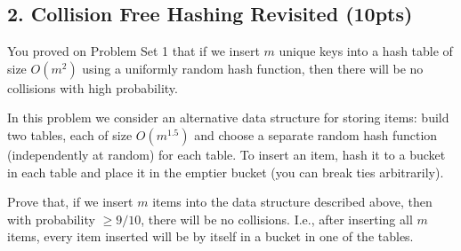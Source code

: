 \documentclass[10pt]{article}
\begin{document}
\begin{enumerate}[label=(\alph*)]
%	
	
\end{enumerate}

\newpage


\subsection{2. Collision Free Hashing Revisited (\textbf {\small 10pts})}
You proved on Problem Set 1 that if we insert $m$ unique keys into a hash table of size  $O(m^2)$ using a uniformly random hash function, then there will be no collisions with high probability. 
\vspace{1em}

In this problem we consider an alternative data structure for storing items: build two tables, each of size $O(m^{1.5})$ and choose a separate random hash function (independently at random) for each table. To insert an item, hash it to a bucket in each table and place it in the emptier bucket (you can break ties arbitrarily).
\vspace{1em}

Prove that, if we insert $m$ items into the data structure described above, then with probability $\geq 9/10$, there will be no collisions. I.e., after inserting all $m$ items, every item inserted will be by itself in a bucket in one of the tables. 
\end{document}
